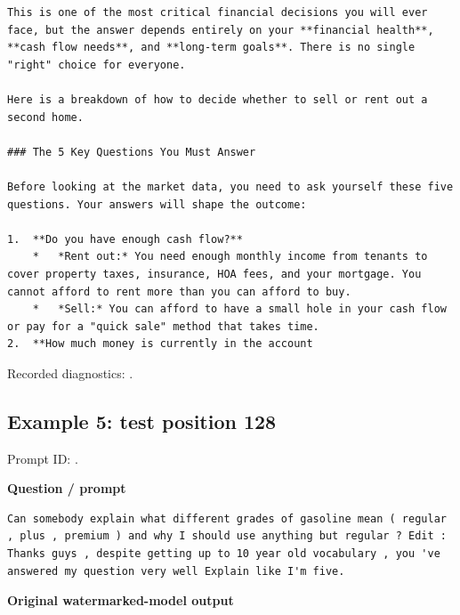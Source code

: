 \begin{Verbatim}
This is one of the most critical financial decisions you will ever face, but the answer depends entirely on your **financial health**, **cash flow needs**, and **long-term goals**. There is no single "right" choice for everyone.

Here is a breakdown of how to decide whether to sell or rent out a second home.

### The 5 Key Questions You Must Answer

Before looking at the market data, you need to ask yourself these five questions. Your answers will shape the outcome:

1.  **Do you have enough cash flow?**
    *   *Rent out:* You need enough monthly income from tenants to cover property taxes, insurance, HOA fees, and your mortgage. You cannot afford to rent more than you can afford to buy.
    *   *Sell:* You can afford to have a small hole in your cash flow or pay for a "quick sale" method that takes time.
2.  **How much money is currently in the account
\end{Verbatim}

Recorded diagnostics:
\texttt{}.

\subsection{Example 5: test position
128}\label{record-docs-watermarking-qualitative-text-latent-smoothing-md-example-5-test-position-128}

Prompt ID:
\texttt{}.

\textbf{Question / prompt}

\begin{Verbatim}
Can somebody explain what different grades of gasoline mean ( regular , plus , premium ) and why I should use anything but regular ? Edit : Thanks guys , despite getting up to 10 year old vocabulary , you 've answered my question very well Explain like I'm five.
\end{Verbatim}

\textbf{Original watermarked-model output}

